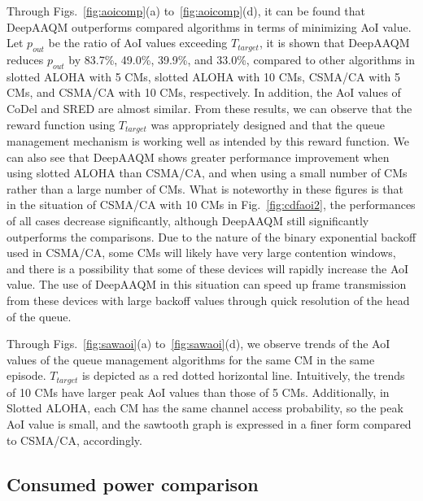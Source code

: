\documentclass[journal]{IEEEtran}
\begin{document}
Through Figs.~\ref{fig:aoicomp}(a) to~\ref{fig:aoicomp}(d), it can be found that DeepAAQM outperforms compared algorithms in terms of minimizing AoI value. Let $p_{out}$ be the ratio of AoI values exceeding $T_{target}$, it is shown that DeepAAQM reduces $p_{out}$ by 83.7\%, 49.0\%, 39.9\%, and 33.0\%, compared to other algorithms in slotted ALOHA with 5 CMs, slotted ALOHA with 10 CMs, CSMA/CA with 5 CMs, and CSMA/CA with 10 CMs, respectively. In addition, the AoI values of CoDel and SRED are almost similar. From these results, we can observe that the reward function using $T_{target}$ was appropriately designed and that the queue management mechanism is working well as intended by this reward function. We can also see that DeepAAQM shows greater performance improvement when using slotted ALOHA than CSMA/CA, and when using a small number of CMs rather than a large number of CMs. 
What is noteworthy in these figures is that in the situation of CSMA/CA with 10 CMs in Fig.~\ref{fig:cdfaoi2}, the performances of all cases decrease significantly, although DeepAAQM still significantly outperforms the comparisons. Due to the nature of the binary exponential backoff used in CSMA/CA, some CMs will likely have very large contention windows, and there is a possibility that some of these devices will rapidly increase the AoI value. The use of DeepAAQM in this situation can speed up frame transmission from these devices with large backoff values through quick resolution of the head of the queue.

Through Figs.~\ref{fig:sawaoi}(a) to~\ref{fig:sawaoi}(d), we observe trends of the AoI values of the queue management algorithms for the same CM in the same episode. $T_{target}$ is depicted as a red dotted horizontal line. Intuitively, the trends of 10 CMs have larger peak AoI values than those of 5 CMs. Additionally, in Slotted ALOHA, each CM has the same channel access probability, so the peak AoI value is small, and the sawtooth graph is expressed in a finer form compared to CSMA/CA, accordingly.

\subsection{Consumed power comparison}
\label{subsec:power}
\end{document}
